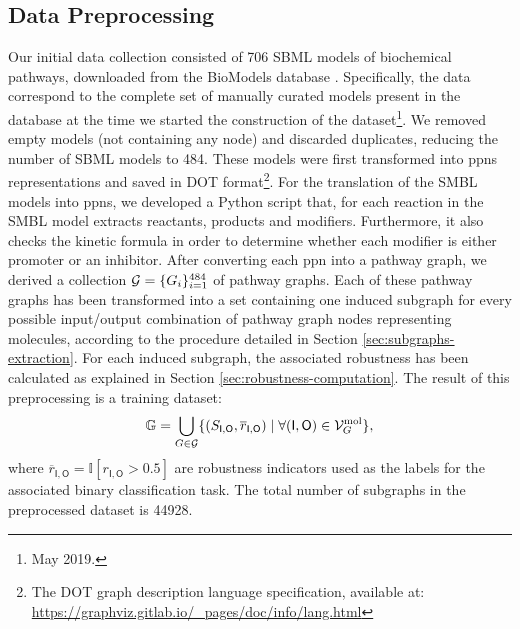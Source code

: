 \subsection{Data Preprocessing}\label{subsec:data-collection}
Our initial data collection consisted of 706 SBML models of biochemical pathways, downloaded from the BioModels database \cite{?}. Specifically, the data correspond to the complete set of manually curated models present in the database at the time we started the construction of the dataset\footnote{May 2019.}. We removed empty models (not containing any node) and discarded duplicates, reducing the number of SBML models to 484. These models were first transformed into \glspl{ppn} representations and saved in DOT format\footnote{The DOT graph description language specification, available at: \url{https://graphviz.gitlab.io/_pages/doc/info/lang.html}}. For the translation of the SMBL models into \glspl{ppn}, we developed a Python script that, for each reaction in the SMBL model extracts reactants, products and modifiers. Furthermore, it also checks the kinetic formula in order to determine whether each modifier is either promoter or an inhibitor. After converting each \gls{ppn} into a pathway graph, we derived a collection $\Cal{G} = \Set{G_i}_{i=1}^{484}$ of pathway graphs.
Each of these pathway graphs has been transformed into a set containing one induced subgraph for every possible input/output combination of pathway graph nodes representing molecules, according to the procedure detailed in Section \ref{sec:subgraphs-extraction}. For each induced subgraph, the associated robustness has been calculated as explained in Section \ref{sec:robustness-computation}. The result of this preprocessing is a training dataset:
$$\mathbb{G} = \bigcup\limits_{G \in \Cal{G}} \Set{(S_{\mathsf{I},\mathsf{O}}, \overline{r}_{{\mathsf{I},\mathsf{O}}}) \mid \forall (\mathsf{I},\mathsf{O}) \in \Cal{V}_{G}^{\Fun{mol}}},$$
where $\overline{r}_{\mathsf{I}, \mathsf{O}} = \mathbb{I}[r_{\mathsf{I}, \mathsf{O}} > 0.5]$ are robustness indicators used as the labels for the associated binary classification task. The total number of subgraphs in the preprocessed dataset is 44928.

